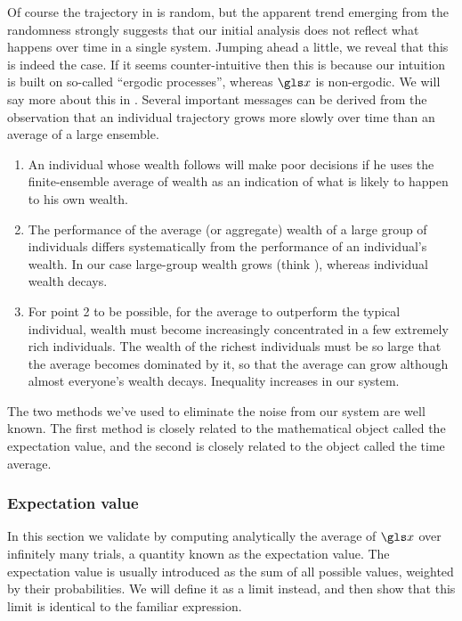 Of course the trajectory in  is random, but the apparent trend emerging from the randomness 
strongly suggests that our initial analysis does not reflect what happens over time in a single system. 
Jumping ahead a little, we reveal that this is indeed the case. If it seems counter-intuitive then this is 
because our intuition is built on so-called ``ergodic processes'', whereas $\x$ is non-ergodic. We will say
more about this in .
Several important messages can be derived from the observation that an individual trajectory grows 
more slowly over time than an average of a large ensemble. 

\begin{enumerate}
\item
An individual whose wealth follows  will make poor decisions if he uses the 
finite-ensemble average of wealth as an indication of what is likely to happen to his own wealth.
\item
The performance of the average (or aggregate) wealth of a large group of individuals differs systematically from 
the performance of an individual's wealth. In our case large-group wealth grows (think \GDP), whereas 
individual wealth decays.
\item
For point 2 to be possible, \ie for the average to outperform the typical individual, wealth must 
become increasingly concentrated in a 
few extremely rich individuals. The wealth of the richest individuals must be so large that the average becomes 
dominated by it, so that the average can grow although almost everyone's wealth decays. Inequality 
increases in our system.
\end{enumerate}

The two methods we've used to eliminate the noise from our system
are well known. The first method is closely related to the mathematical object called the
expectation value, and the second is closely related to the object called the time average.

\subsubsection{Expectation value}
In this section we validate  by computing analytically the
average of $\x$ over infinitely many trials, a quantity known as the expectation value.
The expectation value is usually introduced as the sum of all possible values, 
weighted by their probabilities. We will define it as a limit instead, and then
show that this limit is identical to the familiar expression.

